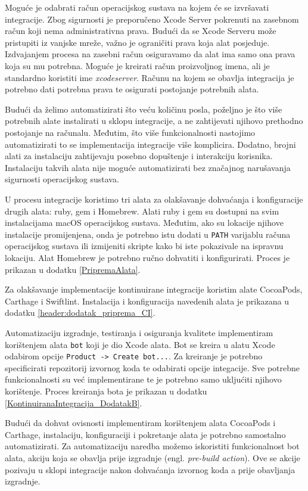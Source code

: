 \documentclass[times, utf8, diplomski, numeric]{fer}
\newcommand{\eng}[1]{(engl. \textit{#1})}
\begin{document}
Moguće je odabrati račun operacijskog sustava na kojem će se izvršavati integracije. Zbog sigurnosti je preporučeno Xcode Server pokrenuti na zasebnom račun koji nema administrativna prava. Budući da se Xcode Serveru može pristupiti iz vanjske mreže, važno je ograničiti prava koja alat posjeduje. Izdvajanjem procesa na zasebni račun osiguravamo da alat ima samo ona prava koja su mu potrebna. Moguće je kreirati račun proizvoljnog imena, ali je standardno koristiti ime \textit{xcodeserver}. Računu na kojem se obavlja integracija je potrebno dati potrebna prava te osigurati postojanje potrebnih alata.

Budući da želimo automatizirati što veću količinu posla, poželjno je što više potrebnih alate instalirati u sklopu integracije, a ne zahtijevati njihovo prethodno postojanje na računalu. Međutim, što više funkcionalnosti nastojimo automatizirati to se implementacija integracije više komplicira. Dodatno, brojni alati za instalaciju zahtijevaju posebno dopuštenje i interakciju korisnika. Instalaciju takvih alata nije moguće automatizirati bez značajnog narušavanja sigurnosti operacijskog sustava.

U procesu integracije koristimo tri alata za olakšavanje dohvaćanja i konfiguracije drugih alata: ruby, gem i Homebrew. Alati ruby i gem su dostupni na svim instalacijama macOS operacijskog sustava. Međutim, ako su lokacije njihove instalacije promijenjena, onda je potrebno istu dodati u \verb|PATH| varijablu računa operacijskog sustava ili izmijeniti skripte kako bi iste pokazivale na ispravnu lokaciju. Alat Homebrew je potrebno ručno dohvatiti i konfigurirati. Proces je prikazan u dodatku \ref{PripremaAlata}.

Za olakšavanje implementacije kontinuirane integracije koristim alate CocoaPods, Carthage i Swiftlint. Instalacija i konfiguracija navedenih alata je prikazana u dodatku \ref{header:dodatak_priprema_CI}.

Automatizaciju izgradnje, testiranja i osiguranja kvalitete implementiram korištenjem alata \verb|bot| koji je dio Xcode alata. Bot se kreira u alatu Xcode odabirom opcije \verb|Product -> Create bot...|. Za kreiranje je potrebno specificirati repozitorij izvornog koda te odabirati opcije integacije. Sve potrebne funkcionalnosti su već implementirane te je potrebno samo ukljućiti njihovo korištenje. Proces kreiranja bota je prikazan u dodatku \ref{KontinuiranaIntegracija_DodatakB}.

Budući da dohvat ovisnosti implementiram korištenjem alata CocoaPods i Carthage, instalaciju, konfiguraciji i pokretanje alata je potrebno samostalno automatizirati. Za automatizaciju naredba možemo iskoristiti funkcionalnost bot alata, akciju koja se obavlja prije izgradnje \eng{pre-build action}. Ove se akcije pozivaju u sklopi integracije nakon dohvaćanja izvornog koda a prije obavljanja izgradnje.
\end{document}
